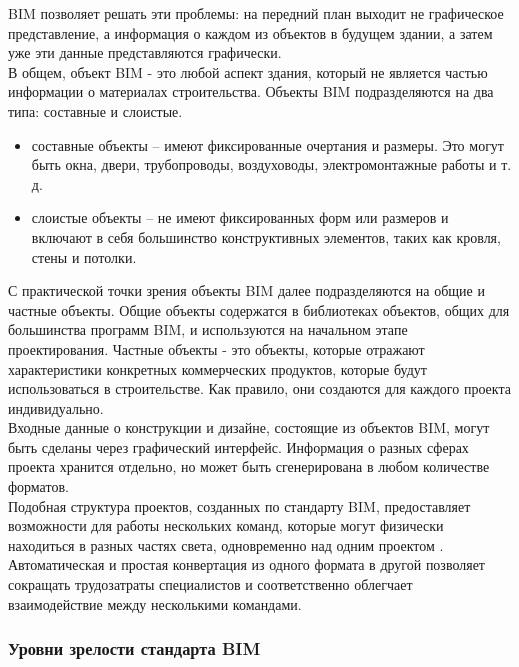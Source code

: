 \documentclass[a4paper,14pt]{extreport} %
\begin{document}
BIM позволяет решать эти проблемы: на передний план выходит не графическое представление, а информация о каждом из объектов в будущем здании, а затем уже эти данные представляются графически. \\
В общем, объект BIM - это любой аспект здания, который не является частью информации о материалах строительства. Объекты BIM подразделяются на два типа: составные и слоистые.
\begin{itemize}
\item составные объекты -- имеют фиксированные очертания и размеры. Это могут быть окна, двери, трубопроводы, воздуховоды, электромонтажные работы и т. д.
\item слоистые объекты -- не имеют фиксированных форм или размеров и включают в себя большинство конструктивных элементов, таких как кровля, стены и потолки.
\end{itemize}
С практической точки зрения объекты BIM далее подразделяются на общие и частные объекты. Общие объекты содержатся в библиотеках объектов, общих для большинства программ BIM, и используются на начальном этапе проектирования. Частные объекты - это объекты, которые отражают характеристики конкретных коммерческих продуктов, которые будут использоваться в строительстве. Как правило, они создаются для каждого проекта индивидуально. \\
Входные данные о конструкции и дизайне, состоящие из объектов BIM, могут быть сделаны через графический интерфейс. Информация о разных сферах проекта хранится отдельно, но может быть сгенерирована в любом количестве форматов. \\
Подобная структура проектов, созданных по стандарту BIM, предоставляет возможности для работы нескольких команд, которые могут физически находиться в разных частях света, одновременно над одним проектом \cite{BIM_ADVANTAGES}. Автоматическая и простая конвертация из одного формата в другой позволяет сокращать трудозатраты специалистов и соответственно облегчает взаимодействие между несколькими командами.
\subsubsection{Уровни зрелости стандарта BIM}
\end{document}
